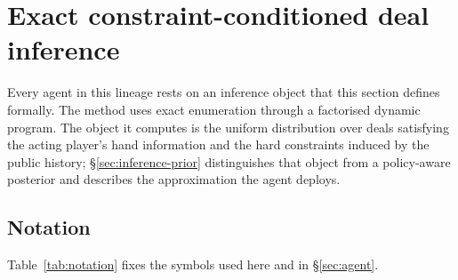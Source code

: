 \section{Exact constraint-conditioned deal inference}
\label{sec:inference}

Every agent in this lineage rests on an inference object that this section defines formally. The
method uses exact enumeration through a factorised dynamic program. The object it computes is the
uniform distribution over deals satisfying the acting player's hand information and the hard
constraints induced by the public history; \S\ref{sec:inference-prior} distinguishes that object
from a policy-aware posterior and describes the approximation the agent deploys.

\subsection{Notation}
\label{sec:inference-notation}

Table~\ref{tab:notation} fixes the symbols used here and in \S\ref{sec:agent}.

